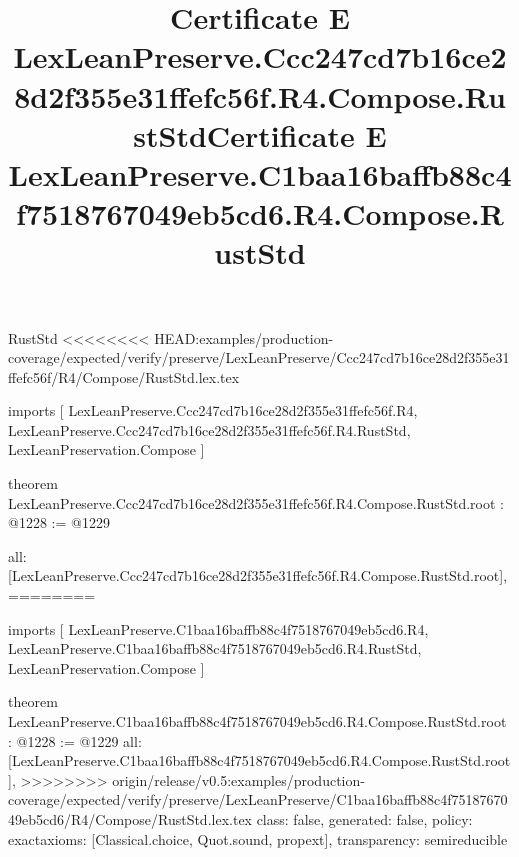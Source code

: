 \begin{lexlean}{RustStd}
<<<<<<<< HEAD:examples/production-coverage/expected/verify/preserve/LexLeanPreserve/Ccc247cd7b16ce28d2f355e31ffefc56f/R4/Compose/RustStd.lex.tex
\title{Certificate E LexLeanPreserve.Ccc247cd7b16ce28d2f355e31ffefc56f.R4.Compose.RustStd}
\begin{coremodule}
imports [
  LexLeanPreserve.Ccc247cd7b16ce28d2f355e31ffefc56f.R4,
  LexLeanPreserve.Ccc247cd7b16ce28d2f355e31ffefc56f.R4.RustStd,
  LexLeanPreservation.Compose
]

theorem LexLeanPreserve.Ccc247cd7b16ce28d2f355e31ffefc56f.R4.Compose.RustStd.root : @1228 := @1229 {
  all: [LexLeanPreserve.Ccc247cd7b16ce28d2f355e31ffefc56f.R4.Compose.RustStd.root],
========
\title{Certificate E LexLeanPreserve.C1baa16baffb88c4f7518767049eb5cd6.R4.Compose.RustStd}
\begin{coremodule}
imports [
  LexLeanPreserve.C1baa16baffb88c4f7518767049eb5cd6.R4,
  LexLeanPreserve.C1baa16baffb88c4f7518767049eb5cd6.R4.RustStd,
  LexLeanPreservation.Compose
]

theorem LexLeanPreserve.C1baa16baffb88c4f7518767049eb5cd6.R4.Compose.RustStd.root : @1228 := @1229 {
  all: [LexLeanPreserve.C1baa16baffb88c4f7518767049eb5cd6.R4.Compose.RustStd.root],
>>>>>>>> origin/release/v0.5:examples/production-coverage/expected/verify/preserve/LexLeanPreserve/C1baa16baffb88c4f7518767049eb5cd6/R4/Compose/RustStd.lex.tex
  class: false,
  generated: false,
  policy: exact{axioms: [Classical.choice, Quot.sound, propext]},
  transparency: semireducible
}


\end{coremodule}}
\end{coremodule}
\end{lexlean}
